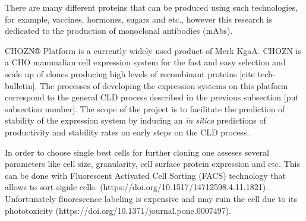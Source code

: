 There are many different proteins that can be produced using such technologies, for example, vaccines, hormones, sugars and etc., however this research is dedicated to the production of monoclonal antibodies (mAbs). 

CHOZN® Platform is a currently widely used product of Merk KgaA. CHOZN is a CHO mammalian cell expression system for the fast and easy selection and scale up of clones producing high levels of recombinant proteins [cite tech-bulletin]. The processes of developing the expression systems on this platform correspond to the general CLD process described in the previous subsection [put subsection number]. The scope of the project is to facilitate the prediction of stability of the expression system by inducing an \textit{in silico} predictions of productivity and stability rates on early steps on the CLD process.

In order to choose single best cells for further cloning one asseses several parameters like cell size, granularity, cell surface protein expression and etc. This can be done with Fluorescent Activated Cell Sorting (FACS) technology that allows to sort signle cells. (https://doi.org/10.1517/14712598.4.11.1821). Unfortunately fluorescence labeling is expensive and may ruin the cell due to its phototoxicity (https://doi.org/10.1371/journal.pone.0007497). 